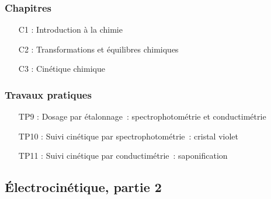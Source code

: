 \documentclass[a4paper, 10pt, final, garamond]{book}
\begin{document}
\begin{multicols}{2}
	\subsubsection{Chapitres}

	\begin{itemize}[label=$\diamond$]
		\item[C1]: Introduction à la chimie
		\item[C2]: Transformations et équilibres chimiques
		\item[C3]: Cinétique chimique
	\end{itemize}

	\columnbreak

	\subsubsection{Travaux pratiques}

	\begin{itemize}[label=$\diamond$]
		\item[TP9]: Dosage par étalonnage~: spectrophotométrie et conductimétrie
		\item[TP10]: Suivi cinétique par spectrophotométrie~: cristal violet
		\item[TP11]: Suivi cinétique par conductimétrie~: saponification
	\end{itemize}

\end{multicols}

\subsection{Électrocinétique, partie 2}
\end{document}
